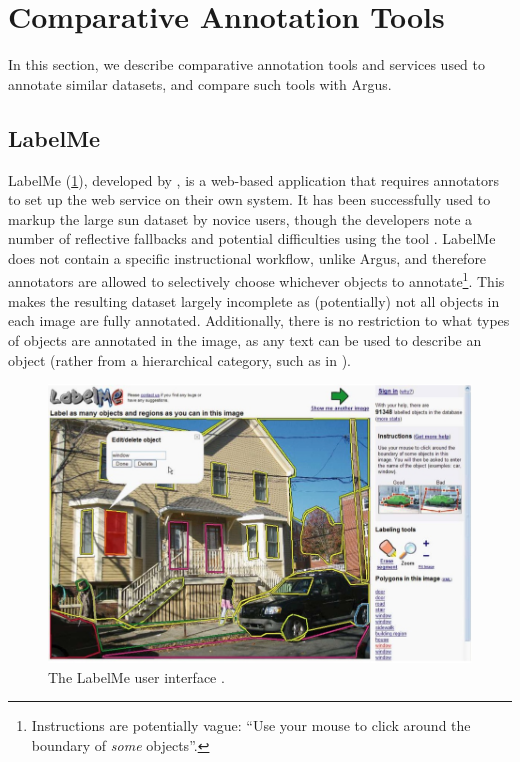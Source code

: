 \section{Comparative Annotation Tools}
\label{sec:dataset:architecture_evaluation:tools}

In this section, we describe comparative annotation tools and services used to annotate similar datasets, and compare such tools with Argus.

\subsection{LabelMe} 

LabelMe (\cref{fig:dataset:architecture_evaluation:tools:label_me}), developed by \citet{Russell:2008wm}, is a web-based application that requires annotators to set up the web service on their own system. It has been successfully used to markup the large \gls{sun} dataset by novice users, though the developers note a number of reflective fallbacks and potential difficulties using the tool \citep{DBLP:journals/corr/abs-1210-3448}. LabelMe does not contain a specific instructional workflow, unlike Argus, and therefore annotators are allowed to selectively choose whichever objects to annotate\footnote{Instructions are potentially vague: ``Use your mouse to click around the boundary of \textit{some} objects''.}. This makes the resulting dataset largely incomplete as (potentially) not all objects in each image are fully annotated. Additionally, there is no restriction to what types of objects are annotated in the image, as any text can be used to describe an object (rather from a hierarchical category, such as in \citep{Lin:2014vma}).

\begin{figure}[h]
  \includegraphics[width=\textwidth]{images/dataset/tools/label_me}
  \caption[The LabelMe user interface]{The LabelMe user interface \citep{Russell:2008wm}.}
  \label{fig:dataset:architecture_evaluation:tools:label_me}
\end{figure}

